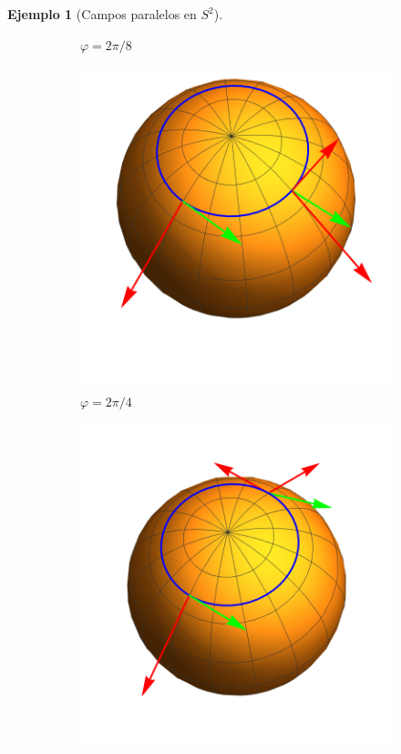 \documentclass[spanish]{book}
\theoremstyle{definition}
\newtheorem*{ejem}{Ejemplo}
\begin{document}
\begin{ejem}[Campos paralelos en $S^2$]
\begin{figure}[H]
\begin{center}
\begin{subfigure}[t]{0.4\linewidth}
			\caption*{$\varphi=2\pi/8$}
		\end{subfigure}
		\begin{subfigure}[t]{0.4\linewidth}
			\centering
			\includegraphics[width=\linewidth]{fig15c}
			\caption*{$\varphi=2\pi/4$}
		\end{subfigure}
		\begin{subfigure}[t]{0.4\linewidth}
			\centering
			\includegraphics[width=\linewidth]{fig15d}

\end{subfigure}
\end{center}
\end{figure}
\end{ejem}
\end{document}
